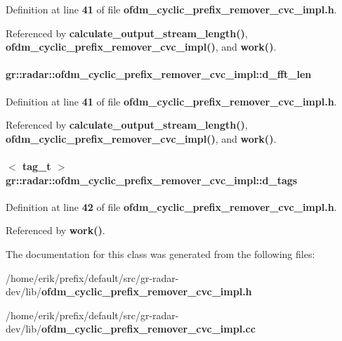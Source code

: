 Definition at line {\bf 41} of file {\bf ofdm\+\_\+cyclic\+\_\+prefix\+\_\+remover\+\_\+cvc\+\_\+impl.\+h}.



Referenced by {\bf calculate\+\_\+output\+\_\+stream\+\_\+length()}, {\bf ofdm\+\_\+cyclic\+\_\+prefix\+\_\+remover\+\_\+cvc\+\_\+impl()}, and {\bf work()}.

\paragraph[{d\+\_\+fft\+\_\+len}]{ gr\+::radar\+::ofdm\+\_\+cyclic\+\_\+prefix\+\_\+remover\+\_\+cvc\+\_\+impl\+::d\+\_\+fft\+\_\+len}\label{classgr_1_1radar_1_1ofdm__cyclic__prefix__remover__cvc__impl_a318e3cdfae84ea873220e5af5d9a13c8}


Definition at line {\bf 41} of file {\bf ofdm\+\_\+cyclic\+\_\+prefix\+\_\+remover\+\_\+cvc\+\_\+impl.\+h}.



Referenced by {\bf calculate\+\_\+output\+\_\+stream\+\_\+length()}, {\bf ofdm\+\_\+cyclic\+\_\+prefix\+\_\+remover\+\_\+cvc\+\_\+impl()}, and {\bf work()}.

\paragraph[{d\+\_\+tags}]{$<$ tag\+\_\+t $>$ gr\+::radar\+::ofdm\+\_\+cyclic\+\_\+prefix\+\_\+remover\+\_\+cvc\+\_\+impl\+::d\+\_\+tags}\label{classgr_1_1radar_1_1ofdm__cyclic__prefix__remover__cvc__impl_afeadc7134addaedc551b4ce648cb028d}


Definition at line {\bf 42} of file {\bf ofdm\+\_\+cyclic\+\_\+prefix\+\_\+remover\+\_\+cvc\+\_\+impl.\+h}.



Referenced by {\bf work()}.



The documentation for this class was generated from the following files\+:\begin{DoxyCompactItemize}
\item 
/home/erik/prefix/default/src/gr-\/radar-\/dev/lib/{\bf ofdm\+\_\+cyclic\+\_\+prefix\+\_\+remover\+\_\+cvc\+\_\+impl.\+h}\item 
/home/erik/prefix/default/src/gr-\/radar-\/dev/lib/{\bf ofdm\+\_\+cyclic\+\_\+prefix\+\_\+remover\+\_\+cvc\+\_\+impl.\+cc}\end{DoxyCompactItemize}
